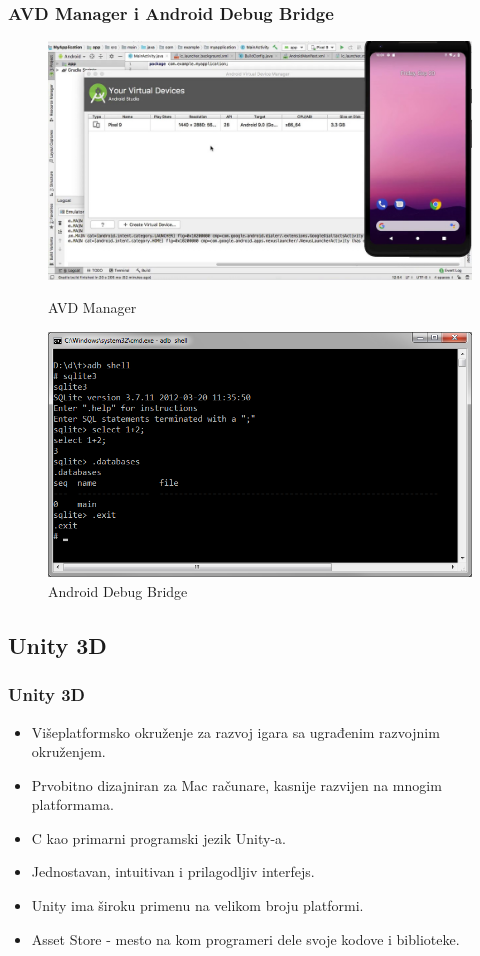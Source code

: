 \documentclass{beamer}
\begin{document}
\begin{frame}
    \frametitle{AVD Manager i Android Debug Bridge}

\begin{figure}
    \centering
    \begin{minipage}{.5\textwidth}
    \centering
    \includegraphics[width=0.9\linewidth]{avd_manager.jpg}
    \caption{AVD Manager}
    \end{minipage}%
    \begin{minipage}{.5\textwidth}
    \centering
    \includegraphics[width=0.8\linewidth]{adb.png}
    \caption{Android Debug Bridge}
    \end{minipage}
\end{figure}

\end{frame}

\begin{frame}
    \section{Unity 3D}
    \frametitle{Unity 3D} 
    \begin{itemize}
	\item Višeplatformsko okruženje za razvoj igara sa ugrađenim razvojnim okruženjem. 
        \item Prvobitno dizajniran za Mac računare, kasnije razvijen na mnogim platformama. 
	\item C kao primarni programski jezik Unity-a.
	\item Jednostavan, intuitivan i prilagodljiv interfejs.
        \item Unity ima široku primenu na velikom broju platformi.
	\item Asset Store - mesto na kom programeri dele svoje kodove i biblioteke. 
   \end{itemize}
\end{frame}
\end{document}

